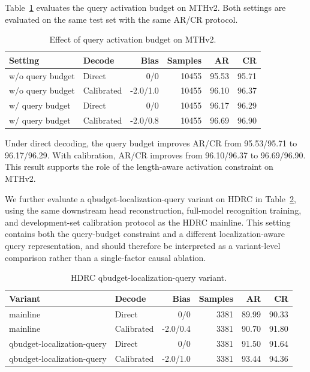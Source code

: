 Table~\ref{tab:qbudget} evaluates the query activation budget on MTHv2. Both settings are evaluated on the same test set with the same AR/CR protocol.

\begin{table}[t]
\centering
\caption{Effect of query activation budget on MTHv2.}
\label{tab:qbudget}
\begin{tabular}{llrrrr}
\toprule
Setting & Decode & Bias & Samples & AR & CR \\
\midrule
w/o query budget & Direct & 0/0 & 10455 & 95.53 & 95.71 \\
w/o query budget & Calibrated & -2.0/1.0 & 10455 & 96.10 & 96.37 \\
w/ query budget & Direct & 0/0 & 10455 & 96.17 & 96.29 \\
w/ query budget & Calibrated & -2.0/0.8 & 10455 & 96.69 & 96.90 \\
\bottomrule
\end{tabular}
\end{table}

Under direct decoding, the query budget improves AR/CR from 95.53/95.71 to 96.17/96.29. With calibration, AR/CR improves from 96.10/96.37 to 96.69/96.90. This result supports the role of the length-aware activation constraint on MTHv2.

We further evaluate a qbudget-localization-query variant on HDRC in Table~\ref{tab:hdrc-qbudget-variant}, using the same downstream head reconstruction, full-model recognition training, and development-set calibration protocol as the HDRC mainline. This setting contains both the query-budget constraint and a different localization-aware query representation, and should therefore be interpreted as a variant-level comparison rather than a single-factor causal ablation.

\begin{table}[t]
\centering
\caption{HDRC qbudget-localization-query variant.}
\label{tab:hdrc-qbudget-variant}
\begin{tabular}{llrrrr}
\toprule
Variant & Decode & Bias & Samples & AR & CR \\
\midrule
mainline & Direct & 0/0 & 3381 & 89.99 & 90.33 \\
mainline & Calibrated & -2.0/0.4 & 3381 & 90.70 & 91.80 \\
qbudget-localization-query & Direct & 0/0 & 3381 & 91.50 & 91.64 \\
qbudget-localization-query & Calibrated & -2.0/1.0 & 3381 & 93.44 & 94.36 \\
\bottomrule
\end{tabular}
\end{table}

